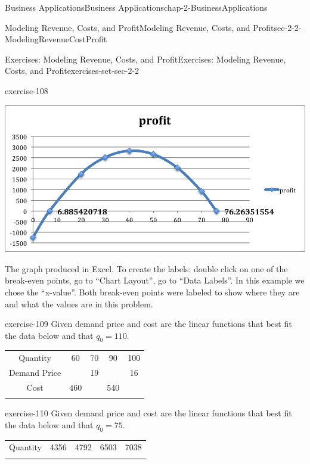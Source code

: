 \documentclass[oneside,10pt,]{book}
\numberwithin{equation}{section}
\newcommand{\hrulethin}  {\noalign{\hrule height 0.04em}}
\newcommand{\hrulemedium}{\noalign{\hrule height 0.07em}}
\newcommand{\hrulethick} {\noalign{\hrule height 0.11em}}
\begin{document}
\begin{chapterptx}{Business Applications}{}{Business Applications}{}{}{chap-2-BusinessApplications}
\begin{sectionptx}{Modeling Revenue, Costs, and Profit}{}{Modeling Revenue, Costs, and Profit}{}{}{sec-2-2-ModelingRevenueCostProfit}
\begin{exercises-subsection-numberless}{Exercises: Modeling Revenue, Costs, and Profit}{}{Exercises: Modeling Revenue, Costs, and Profit}{}{}{exercises-set-sec-2-2}
\begin{exercisegroup}
\begin{divisionexerciseeg}{5}{}{}{exercise-108}
\begin{enumerate}[label=(\alph*)]
\begin{sidebyside}{1}{0}{0}{0}
\begin{sbspanel}{1}
\includegraphics[width=1\linewidth]{images/sec2-2-sol1e.png}
\end{sbspanel}%
\end{sidebyside}%
\par
\hypertarget{p-727}{}%
The graph produced in Excel. To create the labels: double click on one of the break-even points, go to ``Chart Layout'', go to ``Data Labels''. In this example we chose the ``x-value''.  Both break-even points were labeled to show where they are and what the values are in this problem.%
\end{enumerate}
\end{divisionexerciseeg}%
\begin{divisionexerciseeg}{6}{}{}{exercise-109}%
\hypertarget{p-728}{}%
Given demand price and cost are the linear functions that best fit the data below and that \(q_0=110\).%
\begin{sidebyside}{1}{0}{0}{0}%
\begin{sbspanel}{1}%
{\centering%
\begin{tabular}{ccccc}\hrulethick
Quantity&60&70&90&100\tabularnewline\hrulethin
Demand Price&&19&&16\tabularnewline\hrulemedium
Cost&460&&540&\tabularnewline\hrulemedium
\end{tabular}
\par}
\end{sbspanel}%
\end{sidebyside}%
\end{divisionexerciseeg}%
\begin{divisionexerciseeg}{7}{}{}{exercise-110}%
\hypertarget{p-729}{}%
Given demand price and cost are the linear functions that best fit the data below and that \(q_0=75\).%
\begin{sidebyside}{1}{0}{0}{0}%
\begin{sbspanel}{1}%
{\centering%
\begin{tabular}{ccccc}\hrulethick
Quantity&4356&4792&6503&7038\tabularnewline\hrulethin

\end{tabular}}
\end{sbspanel}
\end{sidebyside}
\end{divisionexerciseeg}
\end{exercisegroup}
\end{exercises-subsection-numberless}
\end{sectionptx}
\end{chapterptx}
\end{document}
